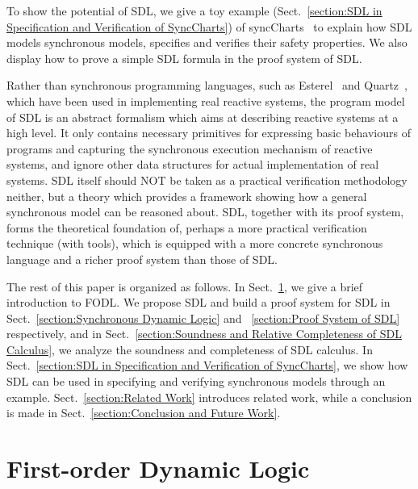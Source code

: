 \documentclass{fcs}
\begin{document}
To show the potential of SDL, we give a toy example (Sect.~\ref{section:SDL in Specification and Verification of SyncCharts}) of syncCharts~\cite{Andre03} to explain how
SDL models synchronous models, specifies and verifies their safety properties.
We also display how to prove a simple SDL formula in the proof system of SDL.

Rather than synchronous programming languages, such as Esterel~\cite{Berry92} and Quartz~\cite{Schneider17}, which have been used in implementing real reactive systems,
the program model of SDL is an abstract formalism which aims at describing reactive systems at a high level.
It only contains necessary primitives for expressing basic behaviours of programs and capturing the synchronous execution mechanism of reactive systems, and ignore other data structures for actual implementation of real systems.
SDL itself should NOT be taken as a practical verification methodology neither, but a theory which provides a framework showing how a general synchronous model can be reasoned about.
SDL, together with its proof system, forms the theoretical foundation of, perhaps a more practical verification technique (with tools), which is equipped with a more concrete synchronous language and a richer proof system than those of SDL.


The rest of this paper is organized as follows.
In Sect.~\ref{section:First-order Dynamic Logic}, we give a brief introduction to FODL.
We propose SDL and build a proof system for SDL in Sect.~\ref{section:Synchronous Dynamic Logic} and ~\ref{section:Proof System of SDL} respectively, and
in Sect.~\ref{section:Soundness and Relative Completeness of SDL Calculus}, we analyze the soundness and completeness of SDL calculus.
In Sect.~\ref{section:SDL in Specification and Verification of SyncCharts}, we show how SDL can be used in specifying and verifying synchronous models through an example.
Sect.~\ref{section:Related Work} introduces related work, while a conclusion is made in Sect.~\ref{section:Conclusion and Future Work}.


\section{First-order Dynamic Logic}
\label{section:First-order Dynamic Logic}
\fi
\end{document}
